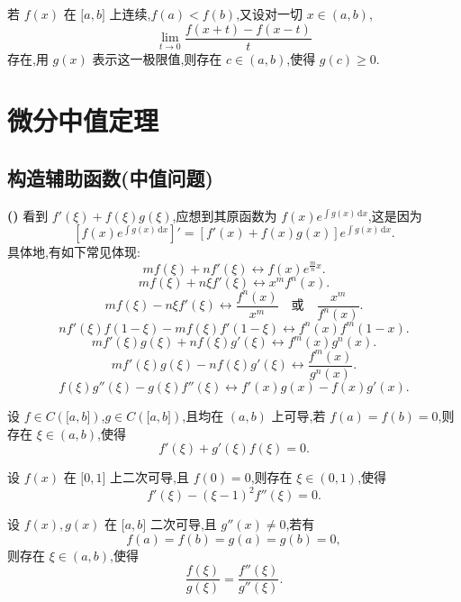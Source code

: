 \documentclass[../../数学分析培优讲义.tex]{subfiles}
\begin{document}
\begin{example}
若 $f(x)$ 在 $\lbrack a,b\rbrack$ 上连续,$f(a)<f(b)$,又设对一切 $x\in(a,b)$,
\[
    \lim\limits_{t\to0}\dfrac{f(x+t)-f(x-t)}{t}
\]
存在,用 $g(x)$ 表示这一极限值,则存在 $c\in(a,b)$,使得 $g(c)\geq0$.
\end{example}
\exampleblank


\newpage

\section{微分中值定理}


\subsection{构造辅助函数(中值问题)}

\noindent\textbf{(\markstar)} 看到 $f'(\xi)+f(\xi)g(\xi)$,应想到其原函数为
$\displaystyle f(x)e^{\int g(x)\,\mathrm{d}x}$,这是因为
\[
    \left[f(x)e^{\int g(x)\,\mathrm{d}x}\right]'
    =[f'(x)+f(x)g(x)]e^{\int g(x)\,\mathrm{d}x}.
\]
具体地,有如下常见体现:
\[
    mf(\xi)+nf'(\xi)
    \longleftrightarrow
    f(x)e^{\frac{m}{n}x}.
\]
\[
    mf(\xi)+n\xi f'(\xi)
    \longleftrightarrow
    x^m f^n(x).
\]
\[
    mf(\xi)-n\xi f'(\xi)
    \longleftrightarrow
    \dfrac{f^n(x)}{x^m}
    \quad\text{或}\quad
    \dfrac{x^m}{f^n(x)}.
\]
\[
    nf'(\xi)f(1-\xi)-mf(\xi)f'(1-\xi)
    \longleftrightarrow
    f^n(x)f^m(1-x).
\]
\[
    mf'(\xi)g(\xi)+nf(\xi)g'(\xi)
    \longleftrightarrow
    f^m(x)g^n(x).
\]
\[
    mf'(\xi)g(\xi)-nf(\xi)g'(\xi)
    \longleftrightarrow
    \dfrac{f^m(x)}{g^n(x)}.
\]
\[
    f(\xi)g''(\xi)-g(\xi)f''(\xi)
    \longleftrightarrow
    f'(x)g(x)-f(x)g'(x).
\]

\begin{example}
设 $f\in C(\lbrack a,b\rbrack)$,$g\in C(\lbrack a,b\rbrack)$,且均在 $(a,b)$ 上可导,若 $f(a)=f(b)=0$,则存在 $\xi\in(a,b)$,使得
\[
    f'(\xi)+g'(\xi)f(\xi)=0.
\]
\end{example}
\exampleblank

\begin{example}
设 $f(x)$ 在 $\lbrack 0,1\rbrack$ 上二次可导,且 $f(0)=0$,则存在 $\xi\in(0,1)$,使得
\[
    f'(\xi)-(\xi-1)^2f''(\xi)=0.
\]
\end{example}
\exampleblank

\begin{example}
设 $f(x),g(x)$ 在 $\lbrack a,b\rbrack$ 二次可导,且 $g''(x)\neq0$,若有
\[
    f(a)=f(b)=g(a)=g(b)=0,
\]
则存在 $\xi\in(a,b)$,使得
\[
    \dfrac{f(\xi)}{g(\xi)}=\dfrac{f''(\xi)}{g''(\xi)}.
\]
\end{example}
\exampleblank
\end{document}
